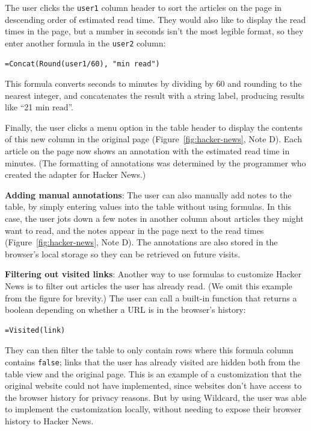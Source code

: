 \documentclass[sigplan,screen,10pt,anonymous,review]{acmart}
\begin{document}
The user clicks the \texttt{user1} column header to sort the articles on
the page in descending order of estimated read time. They would also
like to display the read times in the page, but a number in seconds
isn't the most legible format, so they enter another formula in the
\texttt{user2} column:

\begin{verbatim}
=Concat(Round(user1/60), "min read")
\end{verbatim}

This formula converts seconds to minutes by dividing by 60 and rounding
to the nearest integer, and concatenates the result with a string label,
producing results like ``21 min read''.

Finally, the user clicks a menu option in the table header to display
the contents of this new column in the original page
(Figure~\ref{fig:hacker-news}, Note D). Each article on the page now
shows an annotation with the estimated read time in minutes. (The
formatting of annotations was determined by the programmer who created
the adapter for Hacker News.)

\textbf{Adding manual annotations}: The user can also manually add notes
to the table, by simply entering values into the table without using
formulas. In this case, the user jots down a few notes in another column
about articles they might want to read, and the notes appear in the page
next to the read times (Figure~\ref{fig:hacker-news}, Note D). The
annotations are also stored in the browser's local storage so they can
be retrieved on future visits.

\textbf{Filtering out visited links}: Another way to use formulas to
customize Hacker News is to filter out articles the user has already
read. (We omit this example from the figure for brevity.) The user can
call a built-in function that returns a boolean depending on whether a
URL is in the browser's history:

\begin{verbatim}
=Visited(link)
\end{verbatim}

They can then filter the table to only contain rows where this formula
column contains \texttt{false}; links that the user has already visited
are hidden both from the table view and the original page. This is an
example of a customization that the original website could not have
implemented, since websites don't have access to the browser history for
privacy reasons. But by using Wildcard, the user was able to implement
the customization locally, without needing to expose their browser
history to Hacker News.
\end{document}
